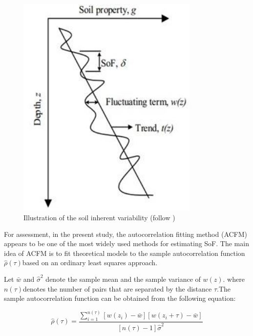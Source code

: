 \begin{figure}[!ht]
    \centering
    
    \includegraphics[width = 90mm]{Figures/figure5.jpg}
    \caption{Illustration of the soil inherent variability (follow \cite{nie2015})}
    \label{fig:fig5}
\captionsetup{belowskip=0pt}
\end{figure}



For assessment, in the present study, the autocorrelation fitting method (ACFM) appears to be one of the most widely used methods for estimating SoF. The main idea of ACFM is to fit theoretical models to the sample autocorrelation function $\hat{\rho}\left ( \tau  \right ) $based on an ordinary least squares approach.



Let $\bar{w}$ and $\hat{\sigma}^{2}$ denote the sample mean and the sample variance of $w\left ( z \right )$. where $n\left ( \tau  \right )$denotes the number of pairs that are separated by the distance $\tau$.The sample autocorrelation function can be obtained from the following equation:

\begin{equation}
 \hat{\rho}\left ( \tau  \right ) = \frac{\sum\limits_{i=1}^{n\left ( \tau  \right )}\left [ w\left ( z_{i}  \right )-  \bar{w}  \right ]\left [  w\left ( z_{i} +   \tau \right ) -\bar{w} \right ]   }{\left [ n\left ( \tau  \right )-1 \right ] \hat{\sigma}^{2}  } 
\end{equation}



